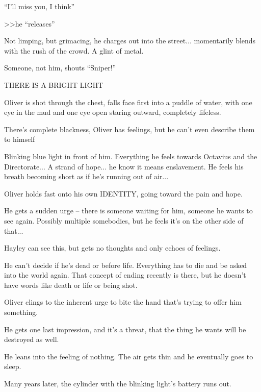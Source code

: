 ``I'll miss you, I think''



\textgreater \textgreater  he ``releases''

Not limping, but grimacing, he charges out into the street... momentarily blends with the rush of the crowd. A glint of metal. 

Someone, not him, shouts ``Sniper!''

THERE IS A BRIGHT LIGHT

Oliver is shot through the chest, falls face first into a puddle of water, with one eye in the mud and one eye open staring outward, completely lifeless.



There's complete blackness, Oliver has feelings, but he can't even describe them to himself

Blinking blue light in front of him.  Everything he feels towards Octavius and the Directorate... A strand of hope... he know it means enslavement. He feels his breath becoming short as if he's running out of air...

Oliver holds fast onto his own IDENTITY, going toward the pain and hope. 

He gets a sudden urge -- there is someone waiting for him, someone he wants to see again. Possibly multiple somebodies, but he feels it's on the other side of that...



Hayley can see this, but gets no thoughts and only echoes of feelings.



He can't decide if he's dead or before life. Everything has to die and be asked into the world again.  That concept of ending recently is there, but he doesn't have words like death or life or being shot.



Oliver clings to the inherent urge to bite the hand that's trying to offer him something. 



He gets one last impression, and it's a threat, that the thing he wants will be destroyed as well. 



He leans into the feeling of nothing.  The air gets thin and he eventually goes to sleep. 



Many years later, the cylinder with the blinking light's battery runs out. 



